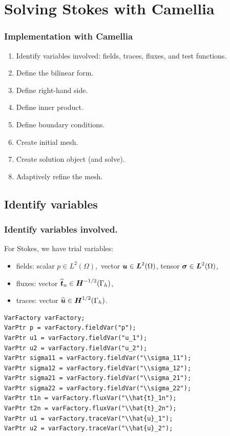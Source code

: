 \documentclass[mathserif]{beamer}
\newcommand{\NVRvect}[1]{\ensuremath\boldsymbol{#1}}
\newcommand{\vect}[1]{\ensuremath\boldsymbol{#1}}
\newcommand{\NVRtensor}[1]{\NVRvect{#1}}
\begin{document}
\section{Solving Stokes with Camellia}
\begin{frame}
\frametitle{Implementation with Camellia}
\begin{enumerate}
\item Identify variables involved: fields, traces, fluxes, and test functions.
\item Define the bilinear form.
\item Define right-hand side.
\item Define inner product.
\item Define boundary conditions.
\item Create initial mesh.
\item Create solution object (and solve).
\item Adaptively refine the mesh.
\end{enumerate}
\end{frame}

\subsection{Identify variables}
\begin{frame}[fragile]
\frametitle{Identify variables involved.}
For Stokes, we have trial variables:
\begin{itemize}
\item fields: scalar $p \in L^{2}(\Omega),$ vector $\vect{u} \in \vect{L}^{2}(\Omega)$, tensor $\NVRtensor{\sigma} \in \vect{L}^{2}(\Omega)$,
\item fluxes: vector $\widehat{\vect{t}}_{n} \in \NVRtensor{H}^{-1/2}(\Gamma_{h})$,
\item traces: vector $\widehat{\vect{u}} \in \vect{H}^{1/2}(\Gamma_{h})$.
\end{itemize}

\begin{lstlisting}
VarFactory varFactory;
VarPtr p = varFactory.fieldVar("p");
VarPtr u1 = varFactory.fieldVar("u_1");
VarPtr u2 = varFactory.fieldVar("u_2");
VarPtr sigma11 = varFactory.fieldVar("\\sigma_11"); 
VarPtr sigma12 = varFactory.fieldVar("\\sigma_12"); 
VarPtr sigma21 = varFactory.fieldVar("\\sigma_21"); 
VarPtr sigma22 = varFactory.fieldVar("\\sigma_22"); 
VarPtr t1n = varFactory.fluxVar("\\hat{t}_1n"); 
VarPtr t2n = varFactory.fluxVar("\\hat{t}_2n"); 
VarPtr u1 = varFactory.traceVar("\\hat{u}_1");
VarPtr u2 = varFactory.traceVar("\\hat{u}_2");
\end{lstlisting}

\end{frame}
\end{document}
